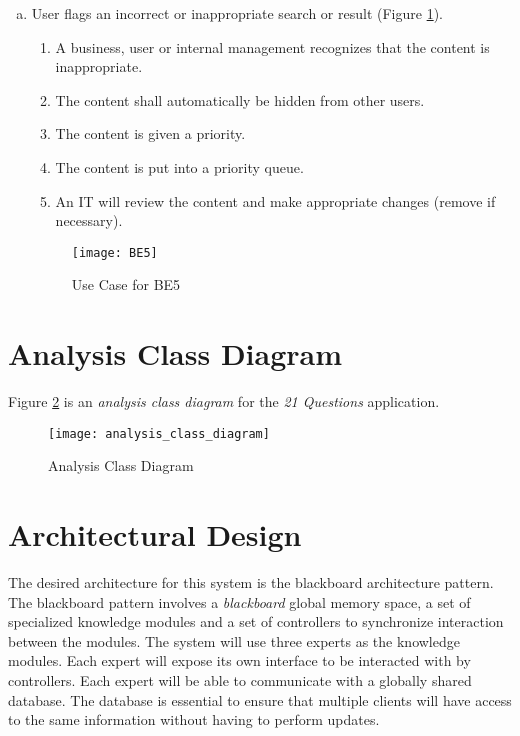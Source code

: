\documentclass[titlepage]{article}
\begin{document}
\begin{enumerate}[a)]
\newpage
	\item User flags an incorrect or inappropriate search or result (Figure \ref{usecase:badsearch}).
		\begin{enumerate}[{BE5}.1]
			\item A business, user or internal management recognizes that the content is inappropriate.
			\item The content shall automatically be hidden from other users.
			\item The content is given a priority.
			\item The content is put into a priority queue.
			\item An IT will review the content and make appropriate changes (remove if necessary).
		\end{enumerate}
	\begin{center}
		\begin{figure}[H]
			\texttt{[image: BE5]}
			\caption{Use Case for BE5}\label{usecase:badsearch}
		\end{figure}
	\end{center}
	
	\end{enumerate}

\newpage

\section{Analysis Class Diagram}
\label{sec:analysis_class_diagram}

Figure \ref{diagram:analysisclass} is an \textit{analysis class diagram} for the \textit{21 Questions} application.

\label{sub:system_architecture}
	\begin{center}
		\begin{figure}[H]
			\texttt{[image: analysis\_class\_diagram]}
			\caption{Analysis Class Diagram}\label{diagram:analysisclass}
		\end{figure}
	\end{center}
	


\section{Architectural Design}
\label{sec:architectural_design}
The desired architecture for this system is the blackboard architecture pattern. The blackboard pattern involves a \textit{blackboard} global memory space, a set of specialized knowledge modules and a set of controllers to synchronize interaction between the modules. The system will use three experts as the knowledge modules. Each expert will expose its own interface to be interacted with by controllers. Each expert will be able to communicate with a globally shared database. The database is essential to ensure that multiple clients will have access to the same information without having to perform updates.
\end{document}
